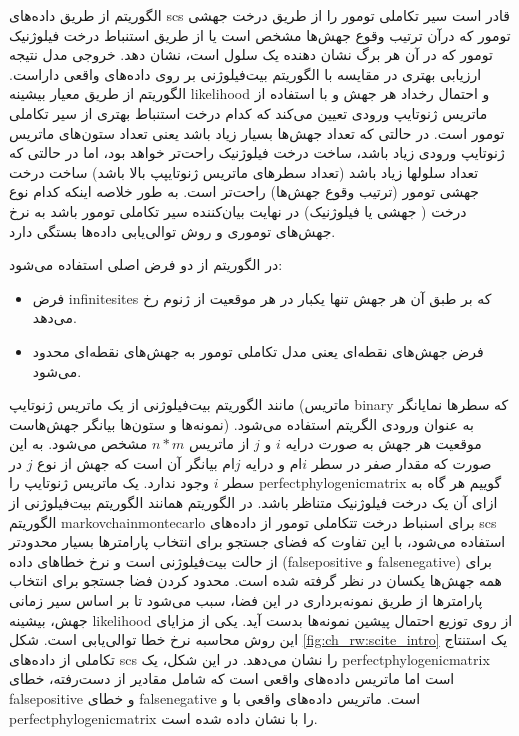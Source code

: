 الگوریتم  از طریق داده‌های \gls{scs} قادر است سیر تکاملی تومور را از طریق درخت جهشی تومور که درآن ترتیب وقوع جهش‌ها مشخص است یا از طریق استنباط درخت فیلوژنیک تومور که در آن هر برگ نشان دهنده یک سلول است، نشان دهد. خروجی مدل  نتیجه ارزیابی بهتری در مقایسه با الگوریتم بیت‌فیلوژنی بر روی داده‌های واقعی داراست. الگوریتم  از طریق معیار بیشینه \gls{likelihood} و احتمال رخداد هر جهش و با استفاده از ماتریس ژنوتایپ ورودی تعیین می‌کند که کدام درخت استنباط بهتری از سیر تکاملی تومور است. در حالتی که تعداد جهش‌ها بسیار زیاد باشد یعنی تعداد ستون‌های ماتریس ژنوتایپ ورودی زیاد باشد، ساخت درخت فیلوژنیک راحت‌تر خواهد بود، اما در حالتی که تعداد سلولها زیاد باشد (تعداد سطرهای ماتریس ژنوتایپپ بالا باشد) ساخت درخت جهشی تومور (ترتیب وقوع جهش‌ها) راحت‌تر است. به طور خلاصه اینکه کدام نوع درخت ( جهشی یا فیلوژنیک) در نهایت بیان‌کننده سیر تکاملی تومور باشد به نرخ جهش‌های توموری و روش توالی‌یابی داده‌ها بستگی دارد.  

در الگوریتم  از دو فرض اصلی استفاده می‌شود: 

\begin{itemize}
	\item     فرض \gls{infinitesites} که بر طبق آن هر جهش تنها یکبار در هر موقعیت از ژنوم رخ ‌می‌دهد. 
	\item	فرض جهش‌های نقطه‌ای یعنی مدل تکاملی تومور به جهش‌های نقطه‌ای محدود می‌شود.  
\end{itemize}


مانند الگوریتم بیت‌فیلوژنی از یک ماتریس ژنوتایپ (ماتریس \gls{binary} که سطرها نمایانگر نمونه‌ها و ستون‌ها بیانگر جهش‌هاست) به عنوان ورودی الگریتم استفاده می‌شود. موقعیت هر جهش به صورت درایه $i$ و $j$ از ماتریس $n*m$ مشخص می‌شود. به این صورت که مقدار صفر در سطر $i$ام و درایه $j$ام بیانگر آن است که جهش از نوع $j$ در سطر $i$ وجود ندارد. یک ماتریس ژنوتایپ را \gls{perfectphylogenicmatrix} گوییم هر گاه به ازای آن یک درخت فیلوژنیک متناظر باشد. در الگوریتم  همانند الگوریتم بیت‌فیلوژنی از الگوریتم \gls{markovchainmontecarlo} برای اسنباط درخت تتکاملی تومور از داده‌های \gls{scs} استفاده می‌شود، با این تفاوت که فضای جستجو برای انتخاب پارامترها بسیار محدودتر از حالت بیت‌فیلوژنی است و نرخ خطاهای داده (\gls{falsepositive} و \gls{falsenegative}) برای همه جهش‌ها یکسان در نظر گرفته شده است. محدود کردن فضا جستجو برای انتخاب پارامترها از طریق نمونه‌برداری در این فضا، سبب می‌شود تا بر اساس سیر زمانی جهش، بیشینه \gls{likelihood} از روی توزیع احتمال پیشین نمونه‌ها بدست آید. یکی از مزایای این روش محاسبه نرخ خطا توالی‌یابی است. شکل \ref{fig:ch_rw:scite_intro} یک استنتاج تکاملی از داده‌های \gls{scs} را نشان می‌دهد. در این شکل،  یک \gls{perfectphylogenicmatrix} است اما  ماتریس داده‌های واقعی است که شامل مقادیر از دست‌رفته، خطای \gls{falsepositive} و خطای \gls{falsenegative}  است. ماتریس داده‌های واقعی با  و \gls{perfectphylogenicmatrix} را با  نشان داده شده است.
 
